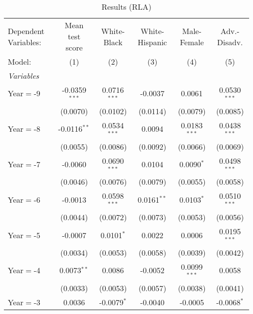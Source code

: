 
\begin{table}[htbp]
   \centering
   \caption{\label{MainResultsRLA} Results (RLA)}
   \begin{tabular}{lccccc}
      \tabularnewline\midrule\midrule
      Dependent Variables: & Mean test score & White-Black     & White-Hispanic & Male-Female     & Adv.-Disadv.\\
      Model:               & (1)             & (2)             & (3)            & (4)             & (5)\\
      \midrule \emph{Variables} &   &   &   &   &  \\
      Year$=$-9            & -0.0359$^{***}$ & 0.0716$^{***}$  & -0.0037        & 0.0061          & 0.0530$^{***}$\\
                           & (0.0070)        & (0.0102)        & (0.0114)       & (0.0079)        & (0.0085)\\
      Year$=$-8            & -0.0116$^{**}$  & 0.0534$^{***}$  & 0.0094         & 0.0183$^{***}$  & 0.0438$^{***}$\\
                           & (0.0055)        & (0.0086)        & (0.0092)       & (0.0066)        & (0.0069)\\
      Year$=$-7            & -0.0060         & 0.0690$^{***}$  & 0.0104         & 0.0090$^{*}$    & 0.0498$^{***}$\\
                           & (0.0046)        & (0.0076)        & (0.0079)       & (0.0055)        & (0.0058)\\
      Year$=$-6            & -0.0013         & 0.0598$^{***}$  & 0.0161$^{**}$  & 0.0103$^{*}$    & 0.0510$^{***}$\\
                           & (0.0044)        & (0.0072)        & (0.0073)       & (0.0053)        & (0.0056)\\
      Year$=$-5            & -0.0007         & 0.0101$^{*}$    & 0.0022         & 0.0006          & 0.0195$^{***}$\\
                           & (0.0034)        & (0.0053)        & (0.0058)       & (0.0039)        & (0.0042)\\
      Year$=$-4            & 0.0073$^{**}$   & 0.0086          & -0.0052        & 0.0099$^{***}$  & 0.0058\\
                           & (0.0033)        & (0.0053)        & (0.0057)       & (0.0038)        & (0.0041)\\
      Year$=$-3            & 0.0036          & -0.0079$^{*}$   & -0.0040        & -0.0005         & -0.0068$^{*}$\\

\end{tabular}
\end{table}
